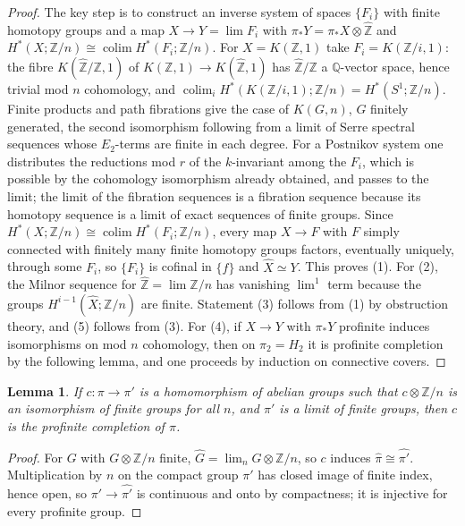 \documentclass[11pt]{amsart}
\theoremstyle{plain}
\newtheorem{lemma}[theorem]{Lemma}
\theoremstyle{definition}
\numberwithin{equation}{section}
\newcommand{\Z}{\mathbb{Z}}
\newcommand{\Q}{\mathbb{Q}}
\newcommand{\Zhat}{\widehat{\mathbb{Z}}}
\newcommand{\hX}{\widehat{X}}
\DeclareMathOperator{\colim}{colim}
\begin{document}
\begin{proof}
The key step is to construct an inverse system of spaces $\{F_i\}$ with finite homotopy groups and a map $X\to Y=\lim F_i$ with $\pi_*Y=\pi_*X\otimes\Zhat$ and $H^*(X;\Z/n)\cong\colim H^*(F_i;\Z/n)$.
For $X=K(\Z,1)$ take $F_i=K(\Z/i,1)$: the fibre $K(\Zhat/\Z,1)$ of $K(\Z,1)\to K(\Zhat,1)$ has $\Zhat/\Z$ a $\Q$-vector space, hence trivial mod $n$ cohomology, and $\colim_iH^*(K(\Z/i,1);\Z/n)=H^*(S^1;\Z/n)$.
Finite products and path fibrations give the case of $K(G,n)$, $G$ finitely generated, the second isomorphism following from a limit of Serre spectral sequences whose $E_2$-terms are finite in each degree.
For a Postnikov system one distributes the reductions mod $r$ of the $k$-invariant among the $F_i$, which is possible by the cohomology isomorphism already obtained, and passes to the limit; the limit of the fibration sequences is a fibration sequence because its homotopy sequence is a limit of exact sequences of finite groups.
Since $H^*(X;\Z/n)\cong\colim H^*(F_i;\Z/n)$, every map $X\to F$ with $F$ simply connected with finitely many finite homotopy groups factors, eventually uniquely, through some $F_i$, so $\{F_i\}$ is cofinal in $\{f\}$ and $\hX\simeq Y$.
This proves (1).
For (2), the Milnor sequence for $\Zhat=\lim\Z/n$ has vanishing $\lim^1$ term because the groups $H^{i-1}(\hX;\Z/n)$ are finite.
Statement (3) follows from (1) by obstruction theory, and (5) follows from (3).
For (4), if $X\to Y$ with $\pi_*Y$ profinite induces isomorphisms on mod $n$ cohomology, then on $\pi_2=H_2$ it is profinite completion by the following lemma, and one proceeds by induction on connective covers.
\end{proof}

\begin{lemma}
If $c\colon\pi\to\pi'$ is a homomorphism of abelian groups such that $c\otimes\Z/n$ is an isomorphism of finite groups for all $n$, and $\pi'$ is a limit of finite groups, then $c$ is the profinite completion of $\pi$.
\end{lemma}

\begin{proof}
For $G$ with $G\otimes\Z/n$ finite, $\widehat G=\lim_n G\otimes\Z/n$, so $c$ induces $\widehat\pi\cong\widehat{\pi'}$.
Multiplication by $n$ on the compact group $\pi'$ has closed image of finite index, hence open, so $\pi'\to\widehat{\pi'}$ is continuous and onto by compactness; it is injective for every profinite group.
\end{proof}
\end{document}
